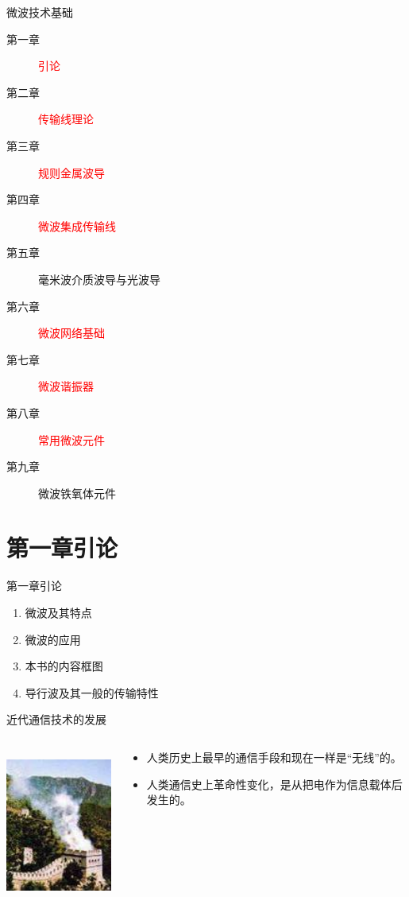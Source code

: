 \documentclass{ctexbeamer}
\begin{document}
\begin{frame}{微波技术基础}
  \begin{description}
    \item[第一章] \textcolor{red}{引论}
    \item[第二章] \textcolor{red}{传输线理论}
    \item[第三章] \textcolor{red}{规则金属波导}
    \item[第四章] \textcolor{red}{微波集成传输线}
    \item[第五章] 毫米波介质波导与光波导
    \item[第六章] \textcolor{red}{微波网络基础}
    \item[第七章] \textcolor{red}{微波谐振器}
    \item[第八章] \textcolor{red}{常用微波元件}
    \item[第九章] 微波铁氧体元件
  \end{description}
\end{frame}

\section{第一章\quad 引论}
\begin{frame}{第一章\quad 引论}
  \begin{enumerate}
    \item 微波及其特点
    \item 微波的应用
    \item 本书的内容框图
    \item 导行波及其一般的传输特性
  \end{enumerate}
\end{frame}

\begin{frame}{近代通信技术的发展}
  \begin{columns}
    \begin{column}{0.35\linewidth}
      \centering
      \includegraphics[height=5cm]{fenghuotai}
    \end{column}
    \begin{column}{0.65\linewidth}
      \centering
      \begin{itemize}
        \item 人类历史上最早的通信手段和现在一样是“无线”的。
        \item 人类通信史上革命性变化，是从把电作为信息载体后发生的。
      \end{itemize}
    \end{column}
  \end{columns}
\end{frame}
\end{document}
